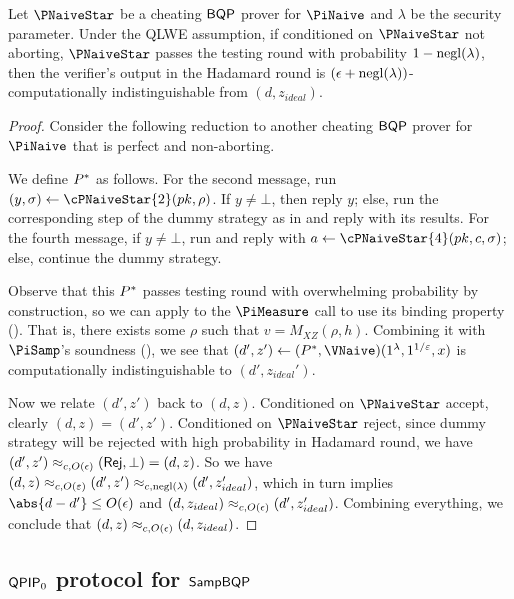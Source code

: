 \begin{lemma}
\label{lem:naive-qpip0-binding}
	Let $\PNaiveStar$ be a cheating $\operatorname{\mathsf{BQP}}$ prover for $\PiNaive$ and $\lambda$ be the security parameter.
	Under the QLWE assumption, if conditioned on $\PNaiveStar$ not aborting, $\PNaiveStar$ passes the testing round with probability $1-\operatorname{negl}(\lambda)$,
	then the verifier's output in the Hadamard round is $(\epsilon+\operatorname{negl}(\lambda))$-computationally indistinguishable from $(d, z_{ideal})$.
\end{lemma}
\begin{proof}
	Consider the following reduction to another cheating $\operatorname{\mathsf{BQP}}$ prover for $\PiNaive$ that is perfect and non-aborting.

	We define $P^*$ as follows.
	For the second message, run $(y, \sigma)\leftarrow\cPNaiveStar{2}(pk, \rho)$.
	If $y\ne\bot$, then reply $y$;
	else, run the corresponding step of the dummy strategy as in  and reply with its results.
	For the fourth message, if $y\ne\bot$, run and reply with $a\leftarrow\cPNaiveStar{4}(pk, c, \sigma)$;
	else, continue the dummy strategy.

	Observe that this $P^*$ passes testing round with overwhelming probability by construction,
	so we can apply  to the $\PiMeasure$ call to use its binding property ().
	That is, there exists some $\rho$ such that $v=M_{XZ}(\rho, h)$.
	Combining it with $\PiSamp$'s soundness (),
	we see that $(d', z')\leftarrow(\Pstar, \VNaive)(1^\lambda, 1^{1/\varepsilon}, x)$ is computationally indistinguishable to $(d', z_{ideal}')$.
	
    Now we relate $(d', z')$ back to $(d, z)$.
	Conditioned on $\PNaiveStar$ accept, clearly $(d, z)=(d', z')$.
	Conditioned on $\PNaiveStar$ reject, since dummy strategy will be rejected with high probability in Hadamard round, 
	we have $(d', z')\approx_{c, O(\epsilon)}(\mathsf{Rej}, \bot)=(d, z)$.
	So we have $(d, z)\approx_{c, O(\varepsilon)}(d', z')\approx_{c, \operatorname{negl}(\lambda)}(d', z_{ideal}')$,
	which in turn implies $\abs{d-d'}\leq O(\eps)$
    and $(d, z_{ideal})\approx_{c, O(\epsilon)}(d', z_{ideal}')$.
    Combining everything, we conclude that $(d, z)\approx_{c, O(\epsilon)}(d, z_{ideal})$.
\end{proof}

\subsection{$\operatorname{\mathsf{QPIP}}_0$ protocol for $\operatorname{\mathsf{SampBQP}}$} \label{sec:qpip0}

